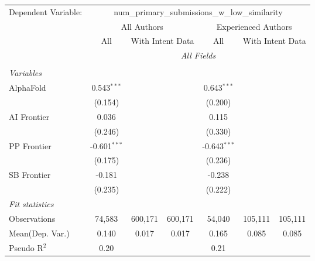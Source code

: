 \begingroup
\centering
\begin{tabular}{lcccccc}
   \tabularnewline \midrule \midrule
   Dependent Variable: & \multicolumn{6}{c}{num\_primary\_submissions\_w\_low\_similarity}\\
 & \multicolumn{3}{c}{All Authors} & \multicolumn{3}{c}{Experienced Authors} \\
\cmidrule(lr){2-4} \cmidrule(lr){5-7}
 & \multicolumn{1}{c}{All} & \multicolumn{2}{c}{With Intent Data} & \multicolumn{1}{c}{All} & \multicolumn{2}{c}{With Intent Data} \\
\cmidrule(lr){2-2} \cmidrule(lr){3-4} \cmidrule(lr){5-5} \cmidrule(lr){6-7}
 & \multicolumn{6}{c}{\textit{All Fields}} \\ \\
   \emph{Variables}\\
   AlphaFold    & 0.543$^{***}$  &         &         & 0.643$^{***}$  &         &   \\   
                & (0.154)        &         &         & (0.200)        &         &   \\   
   AI Frontier  & 0.036          &         &         & 0.115          &         &   \\   
                & (0.246)        &         &         & (0.330)        &         &   \\   
   PP Frontier  & -0.601$^{***}$ &         &         & -0.643$^{***}$ &         &   \\   
                & (0.175)        &         &         & (0.236)        &         &   \\   
   SB Frontier  & -0.181         &         &         & -0.238         &         &   \\   
                & (0.235)        &         &         & (0.222)        &         &   \\   
   \midrule
   \emph{Fit statistics}\\
   Observations & 74,583         & 600,171 & 600,171 & 54,040         & 105,111 & 105,111\\  
Mean(Dep. Var.) & 0.140 & 0.017 & 0.017 & 0.165 & 0.085 & 0.085 \\
   Pseudo R$^2$ & 0.20           &         &         & 0.21           &         & \\  
   

\end{tabular}
